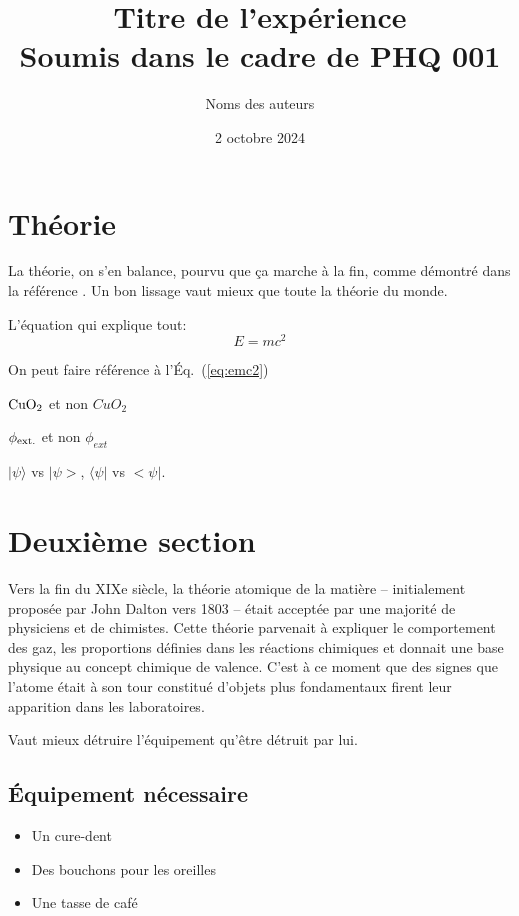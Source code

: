 \documentclass[11pt]{article}
\title{Titre de l'expérience\\[12pt]
\normalsize Soumis dans le cadre de PHQ 001}
\author{Noms des auteurs}
\date{2 octobre 2024}
\begin{document}
\maketitle

\section{Théorie}

La théorie, on s'en balance, pourvu que ça marche à la fin, comme démontré dans la référence \cite{bib:einstein}.
Un bon lissage vaut mieux que toute la théorie du monde.

L'équation qui explique tout:
\begin{equation}
\label{eq:emc2}
E = mc^2
\end{equation}

On peut faire référence à l'Éq.~(\ref{eq:emc2})

$\rm CuO_2$ et non $CuO_2$

$\phi_{\rm ext.}$ et non $\phi_{ext}$

$|\psi\rangle$ vs $|\psi>$,  $\langle\psi|$ vs $<\psi|$.

\section{Deuxième section}

Vers la fin du XIXe siècle, la théorie atomique de la matière -- initialement proposée par John Dalton vers 1803 -- était acceptée par une majorité de physiciens et de chimistes.
Cette théorie parvenait à expliquer le comportement des gaz, les proportions définies dans les réactions chimiques et donnait une base physique au concept chimique de valence.
C'est à ce moment que des signes que l'atome était à son tour constitué d'objets plus fondamentaux firent leur apparition dans les laboratoires.




\begin{objectif}
Vaut mieux détruire l'équipement qu'être détruit par lui.
\end{objectif}

\subsection{Équipement nécessaire}

\begin{itemize}
\item Un cure-dent
\item Des bouchons pour les oreilles
\item Une tasse de café
\end{itemize}
\end{document}
